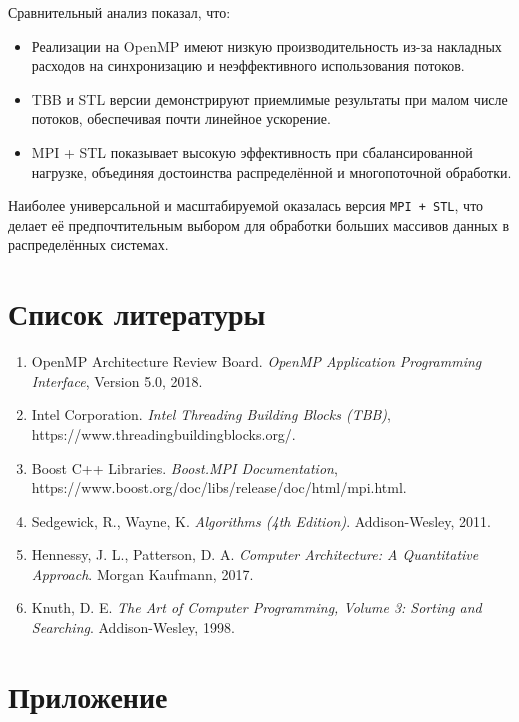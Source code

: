 \documentclass[12pt]{article}
\begin{document}
Сравнительный анализ показал, что:
\begin{itemize}
  \item Реализации на OpenMP имеют низкую производительность из-за накладных расходов на синхронизацию и неэффективного использования потоков.
  \item TBB и STL версии демонстрируют приемлимые результаты при малом числе потоков, обеспечивая почти линейное ускорение.
  \item MPI + STL показывает высокую эффективность при сбалансированной нагрузке, объединяя достоинства распределённой и многопоточной обработки.
\end{itemize}

Наиболее универсальной и масштабируемой оказалась версия \texttt{MPI + STL}, что делает её предпочтительным выбором для обработки больших массивов данных в распределённых системах.

\newpage

\section{Список литературы}

\begin{enumerate}
  \item OpenMP Architecture Review Board. \textit{OpenMP Application Programming Interface}, Version 5.0, 2018.
  \item Intel Corporation. \textit{Intel Threading Building Blocks (TBB)}, https://www.threadingbuildingblocks.org/.
  \item Boost C++ Libraries. \textit{Boost.MPI Documentation}, https://www.boost.org/doc/libs/release/doc/html/mpi.html.
  \item Sedgewick, R., Wayne, K. \textit{Algorithms (4th Edition)}. Addison-Wesley, 2011.
  \item Hennessy, J. L., Patterson, D. A. \textit{Computer Architecture: A Quantitative Approach}. Morgan Kaufmann, 2017.
  \item Knuth, D. E. \textit{The Art of Computer Programming, Volume 3: Sorting and Searching}. Addison-Wesley, 1998.
\end{enumerate}

\newpage

\section*{Приложение}
\end{document}
